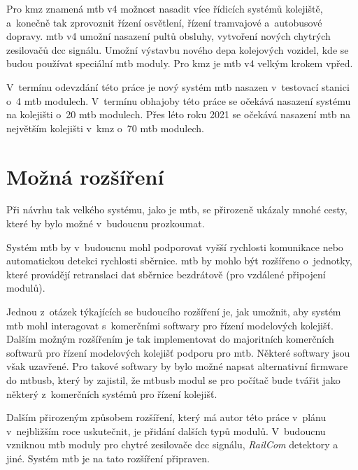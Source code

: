 Pro \gls{kmz} znamená \gls{mtb} v4 možnost nasadit více řídicích systémů
kolejiště, a~konečně tak zprovoznit řízení osvětlení, řízení tramvajové
a~autobusové dopravy. \gls{mtb} v4 umožní nasazení pultů obsluhy,
vytvoření nových chytrých zesilovačů \gls{dcc} signálu. Umožní výstavbu nového
depa kolejových vozidel, kde se budou používat speciální \gls{mtb} moduly.
Pro \gls{kmz} je \gls{mtb} v4 velkým krokem vpřed.

V~termínu odevzdání této práce je nový systém \gls{mtb} nasazen v~testovací
stanici o~4 \gls{mtb} modulech. V~termínu obhajoby této práce se očekává nasazení
systému na kolejišti o~20 \gls{mtb} modulech. Přes léto roku 2021 se očekává
nasazení \gls{mtb} na největším kolejišti v~\gls{kmz} o~70 \gls{mtb} modulech.

\section{Možná rozšíření} \label{sec:future}

Při návrhu tak velkého systému, jako je \gls{mtb}, se přirozeně ukázaly mnohé
cesty, které by bylo možné v~budoucnu prozkoumat.

Systém \gls{mtb} by v~budoucnu mohl podporovat vyšší rychlosti komunikace nebo
automatickou detekci rychlosti sběrnice. \gls{mtb} by mohlo být rozšířeno
o~jednotky, které provádějí retranslaci dat sběrnice bezdrátově (pro vzdálené
připojení modulů).

Jednou z~otázek týkajících se budoucího rozšíření je, jak umožnit, aby systém
\gls{mtb} mohl interagovat s~komerčními softwary pro řízení modelových
kolejišť.
Dalším možným rozšířením je tak implementovat do majoritních komerčních
softwarů pro řízení modelových kolejišť podporu pro \gls{mtb}. Některé softwary
jsou však uzavřené. Pro takové softwary by bylo možné napsat alternativní
firmware do \gls{mtbusb}, který by zajistil, že \gls{mtbusb} modul se pro
počítač bude tvářit jako některý z~komerčních systémů pro řízení kolejišť.

Dalším přirozeným způsobem rozšíření, který má autor této práce v~plánu
v~nejbližším roce uskutečnit, je přidání dalších typů modulů. V~budoucnu
vzniknou \gls{mtb} moduly pro chytré zesilovače \gls{dcc} signálu,
\textit{RailCom} detektory a jiné. Systém \gls{mtb} je na tato rozšíření
připraven.
